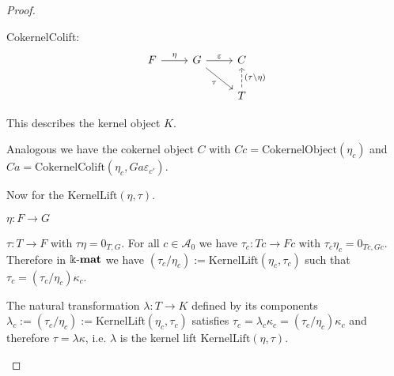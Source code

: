 \begin{proof}
\begin{enumerate}
\begin{subproof}
CokernelColift:
\[
\begin{tikzcd}
F \arrow[r, "\eta"] & G \arrow[r, "\varepsilon"] \arrow[rd, "\tau"'] & C                                            \\
                    &                                                & T \arrow[u, "(\tau\backslash\eta)"', dashed]
\end{tikzcd}
\]

This describes the kernel object $K$.

Analogous we have the cokernel object $C$ with $Cc = \mathrm{CokernelObject}(\eta_{c})$ and
$Ca = \mathrm{CokernelColift}(\eta_{c}, Ga\varepsilon_{c'})$.

Now for the $\mathrm{KernelLift}(\eta, \tau)$.

$\eta : F \rightarrow G$

$\tau : T \rightarrow F$ with $\tau \eta = 0_{T,G}$. For all $c \in \mathcal{A}_{0}$ we have
$\tau_{c} : Tc \rightarrow Fc$ with $\tau_{c} \eta_{c} = 0_{Tc,Gc}$. Therefore in $\Bbbk\textnormal{-}\mathbf{mat}$ we have
$(\tau_{c} / \eta_{c} ) := \mathrm{KernelLift}( \eta_{c}, \tau_{c} )$ such that $\tau_{c} = (\tau_{c} / \eta_{c} ) \kappa_{c}$.

The natural transformation $\lambda : T \rightarrow K$ defined by its components
$\lambda_{c} := (\tau_{c} / \eta_{c}) := \mathrm{KernelLift}( \eta_{c}, \tau_{c} )$ satisfies
$\tau_{c} = \lambda_{c} \kappa_{c} = (\tau_{c} / \eta_{c} ) \kappa_{c}$ and therefore
$\tau = \lambda \kappa$, i.e. $\lambda$ is the kernel lift $\mathrm{KernelLift}(\eta, \tau)$.

\end{subproof}


\end{enumerate}
\end{proof}
